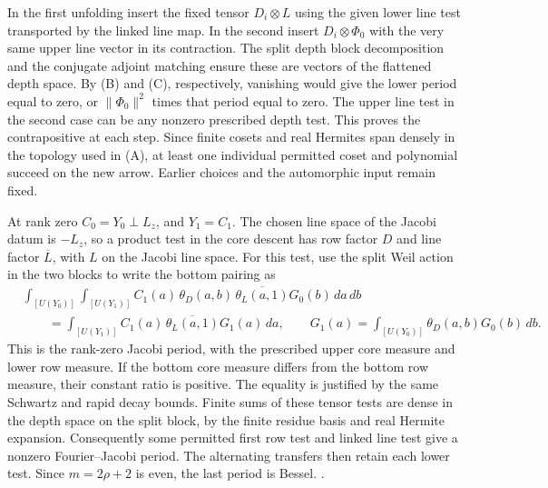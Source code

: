 In the first unfolding insert the fixed tensor
\(D_i\otimes L\) using the given lower line test transported
by the linked line map. In the second insert
\(D_i\otimes\Phi_0\) with the very same upper line vector
in its contraction. The split depth block decomposition and
the conjugate adjoint matching ensure these are vectors of
the flattened depth space. By (B) and (C), respectively,
vanishing would give the lower period equal to zero, or
\(\|\Phi_0\|^2\) times that period equal to zero. The upper
line test in the second case can be any nonzero prescribed
depth test. This proves the contrapositive at each step. Since
finite cosets and real Hermites span densely in the topology
used in (A), at least one individual permitted coset and
polynomial succeed on the new arrow. Earlier choices and
the automorphic input remain fixed.

At rank zero \(C_0=Y_0\perp L_z\), and \(Y_1=C_1\).
The chosen line space of the Jacobi datum is \(-L_z\), so a
product test in the core descent has row factor \(D\) and
line factor \(\overline{L}\), with \(L\) on the Jacobi
line space. For this test, use the split Weil action in the two
blocks to write the bottom pairing as
\[
 \begin{split}
 &\int_{[U(Y_0)]}\int_{[U(Y_1)]}
      C_1(a)\,\theta_D(a,b)\,\overline{\theta_L(a,1)}
                       G_0(b)\,da\,db \\
 &\qquad=\int_{[U(Y_1)]} C_1(a)\,\overline{\theta_L(a,1)}
                                    G_1(a)\,da,
 \qquad G_1(a)=\int_{[U(Y_0)]}\theta_D(a,b)G_0(b)\,db .
 \end{split}
\]
This is the rank-zero Jacobi period, with the prescribed
upper core measure and lower row measure. If the bottom core
measure differs from the bottom row measure, their constant
ratio is positive. The equality is justified by the same
Schwartz and rapid decay bounds. Finite sums of these tensor
tests are dense in the depth space on the split block, by the
finite residue basis and real Hermite expansion. Consequently
some permitted first row test and linked line test give a
nonzero Fourier--Jacobi period. The alternating transfers
then retain each lower test. Since \(m=2\rho+2\) is even,
the last period is Bessel.
.

